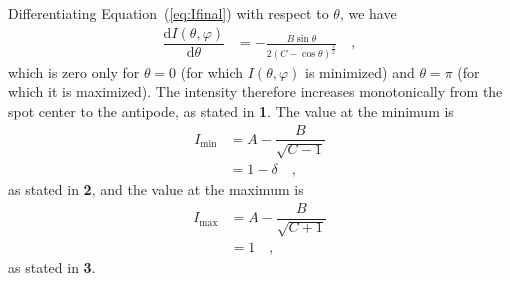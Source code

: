 \documentclass[modern]{aastex62}
\begin{document}
Differentiating Equation~(\ref{eq:Ifinal}) with respect to $\theta$, we have
%
\begin{align}
    \label{eq:Ideriv}
    \dfrac{\mathrm{d}I(\theta, \varphi)}{\mathrm{d}\theta} & =
    -\frac{B\sin\theta}{2(C - \cos\theta)^\frac{3}{2}}
    \quad,
\end{align}
%
which is zero only for $\theta = 0$ (for which $I(\theta, \varphi)$ is
minimized) and $\theta = \pi$ (for which it is maximized). The intensity
therefore increases monotonically from the spot center to the antipode,
as stated in \textbf{1}. The value at the minimum is
%
\begin{align}
    I_{\mathrm{min}} & = A - \dfrac{B}{\sqrt{C - 1}} \\
                     & = 1 - \delta
    \quad,
\end{align}
%
as stated in \textbf{2}, and the value at the maximum is
%
\begin{align}
    I_{\mathrm{max}} & = A - \dfrac{B}{\sqrt{C + 1}} \\
                     & = 1
    \quad,
\end{align}
%
as stated in \textbf{3}.
\end{document}
